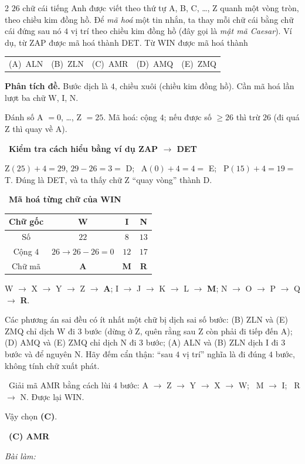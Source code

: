 \documentclass[11pt]{article}
\makeatletter
\newif\ifsol \solfalse
\providecommand{\AnsWord}{Đáp số}
\newenvironment{probbox}[2]{\begin{probboxT}{#1}{#2}}{\end{probboxT}}
\newcommand{\StuProb}[2]{\begin{probboxS}{#1}{#2}\StuProbBody\end{probboxS}}
\newcommand{\ans}[1]{\par\smallskip{\bfseries\color{tmGreen!88!black}\AnsWord:}\ {\bfseries\color{AnsRed}#1}\par}
\newcommand{\probsol}[1]{%
  \begin{lrbox}{\solmeasure}\begin{minipage}{\dimexpr\linewidth-24pt\relax}#1\end{minipage}\end{lrbox}%
  \ifsol
    \begin{solbox}#1\end{solbox}%
  \else
    \setlength{\solht}{\dimexpr\ht\solmeasure+\dp\solmeasure+0.85cm\relax}%
    \ifdim\solht<1.35cm\setlength{\solht}{1.35cm}\fi
    \ifdim\solht>\StudentMaxWork\setlength{\solht}{\StudentMaxWork}\fi
    \par\noindent\begin{minipage}{\linewidth}%
    \expandafter\StuProb\StuProbArgs
    \begin{tcolorbox}[colback=white,colframe=Line,boxrule=0.8pt,arc=5pt,
      left=8pt,right=8pt,top=4pt,bottom=4pt,height=\solht]{\footnotesize\color{Slate}\itshape\WorkWord}\end{tcolorbox}%
    \end{minipage}\par\medskip
  \fi}
\newlength{\StudentMaxWork}\setlength{\StudentMaxWork}{4.5cm}
\newcommand{\step}[2]{\par\smallskip\noindent{\bfseries\color{tmBlue!85!black}\StepWord~#1.}\ {\bfseries #2}\par\nopagebreak}
\newcommand{\verify}[1]{\par\smallskip\noindent{\bfseries\color{tmGreen!80!black}\faCheckCircle\ \CheckWord}\ #1\par}
\newcommand{\choices}[5]{\par\smallskip\noindent
  \begin{tabularx}{\linewidth}{@{}XXXXX@{}}(A)\ #1&(B)\ #2&(C)\ #3&(D)\ #4&(E)\ #5\end{tabularx}\par}
\def\WorkWord{Bài làm:}
\def\AnsWord{Đáp số}
\def\StepWord{Bước}
\def\CheckWord{Thử lại:}
\makeatother
\begin{document}
\begin{probbox}{2}{\relax}
$26$ chữ cái tiếng Anh được viết theo thứ tự A, B, C, \ldots, Z quanh một vòng tròn, theo chiều kim đồng hồ. Để \emph{mã hoá} một
tin nhắn, ta thay mỗi chữ cái bằng chữ cái đứng sau nó $4$ vị trí theo chiều kim đồng hồ (đây gọi là \emph{mật mã Caesar}).
Ví dụ, từ ZAP được mã hoá thành DET. Từ WIN được mã hoá thành
\choices{ALN}{ZLN}{AMR}{AMQ}{ZMQ}
\end{probbox}
\probsol{
\textbf{Phân tích đề.} Bước dịch là $4$, chiều xuôi (chiều kim đồng hồ). Cần mã hoá lần lượt ba chữ W, I, N.
\begin{recallbox}Đánh số A $= 0$, \ldots, Z $= 25$. Mã hoá: cộng $4$; nếu được số $\ge 26$ thì trừ $26$ (đi quá Z thì quay về A).\end{recallbox}
\step{1}{Kiểm tra cách hiểu bằng ví dụ ZAP $\to$ DET}
Z$(25) + 4 = 29$, $29 - 26 = 3 =$ D; \ A$(0) + 4 = 4 =$ E; \ P$(15) + 4 = 19 =$ T. Đúng là DET, và ta thấy chữ Z ``quay vòng'' thành D.
\step{2}{Mã hoá từng chữ của WIN}
\begin{center}
\begin{tabular}{|c|c|c|c|}
\hline
\rowcolor{tmBlue!10} Chữ gốc & W & I & N \\ \hline
Số & $22$ & $8$ & $13$ \\ \hline
Cộng $4$ & $26 \to 26 - 26 = 0$ & $12$ & $17$ \\ \hline
Chữ mã & \textbf{A} & \textbf{M} & \textbf{R} \\ \hline
\end{tabular}
\end{center}
\begin{center}
W $\to$ X $\to$ Y $\to$ Z $\to$ \textbf{A}; \qquad I $\to$ J $\to$ K $\to$ L $\to$ \textbf{M}; \qquad N $\to$ O $\to$ P $\to$ Q $\to$ \textbf{R}.
\end{center}
\begin{warnbox}Các phương án sai đều có ít nhất một chữ bị dịch sai số bước: (B) ZLN và (E) ZMQ chỉ dịch W đi $3$ bước (dừng ở Z, quên
rằng sau Z còn phải đi tiếp đến A); (D) AMQ và (E) ZMQ chỉ dịch N đi $3$ bước; (A) ALN và (B) ZLN dịch I đi $3$ bước và để nguyên N.
Hãy đếm cẩn thận: ``sau $4$ vị trí'' nghĩa là đi đúng $4$ bước, không tính chữ xuất phát.\end{warnbox}
\verify{Giải mã AMR bằng cách lùi $4$ bước: A $\to$ Z $\to$ Y $\to$ X $\to$ W; \ M $\to$ I; \ R $\to$ N. Được lại WIN.}
Vậy chọn \textbf{(C)}.
\ans{(C) AMR}
}
\end{document}
